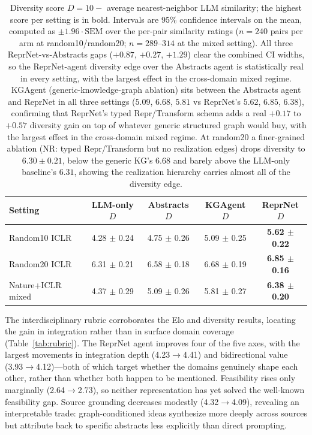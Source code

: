 \documentclass[10pt,twocolumn]{article}
\begin{document}
\begin{table}[t]
\centering
\small
\setlength{\tabcolsep}{4pt}
\begin{tabular}{lcccc}
\toprule
Setting           & LLM-only $D$     & Abstracts $D$    & KGAgent $D$      & ReprNet $D$ \\
\midrule
Random10 ICLR     & 4.28 $\pm$ 0.24 & 4.75 $\pm$ 0.26 & 5.09 $\pm$ 0.25 & \textbf{5.62 $\pm$ 0.22} \\
Random20 ICLR     & 6.31 $\pm$ 0.21 & 6.58 $\pm$ 0.18 & 6.68 $\pm$ 0.19 & \textbf{6.85 $\pm$ 0.16} \\
Nature+ICLR mixed & 4.37 $\pm$ 0.29 & 5.09 $\pm$ 0.26 & 5.81 $\pm$ 0.27 & \textbf{6.38 $\pm$ 0.20} \\
\bottomrule
\end{tabular}
\caption{Diversity score $D = 10 -$ average nearest-neighbor LLM
similarity; the highest score per setting is in bold.  Intervals are
95\% confidence intervals on the mean, computed as $\pm 1.96 \cdot
\mathrm{SEM}$ over the per-pair similarity ratings ($n = 240$ pairs
per arm at random10/random20; $n = 289$--$314$ at the mixed
setting).  All three ReprNet-vs-Abstracts gaps ($+0.87$, $+0.27$,
$+1.29$) clear the combined CI widths, so the ReprNet-agent diversity
edge over the Abstracts agent is statistically real in every
setting, with the largest effect in the cross-domain mixed regime.
KGAgent (generic-knowledge-graph ablation) sits between the Abstracts
agent and ReprNet in all three settings ($5.09$, $6.68$, $5.81$ vs
ReprNet's $5.62$, $6.85$, $6.38$), confirming that ReprNet's typed
Repr/Transform schema adds a real $+0.17$ to $+0.57$ diversity gain
on top of whatever generic structured graph would buy, with the
largest effect in the cross-domain mixed regime.  At random20 a
finer-grained ablation (NR: typed Repr/Transform but no realization
edges) drops diversity to $6.30 \pm 0.21$, below the generic KG's
$6.68$ and barely above the LLM-only baseline's $6.31$, showing the
realization hierarchy carries almost all of the diversity edge.}
\label{tab:diversity}
\end{table}

The interdisciplinary rubric corroborates the Elo and diversity results,
locating the gain in integration rather than in surface domain coverage
(Table~\ref{tab:rubric}).  The ReprNet agent improves four of the five
axes, with the largest movements in integration depth (4.23$\to$4.41) and
bidirectional value (3.93$\to$4.12)---both of which target whether the
domains genuinely shape each other, rather than whether both happen to be
mentioned.  Feasibility rises only marginally (2.64$\to$2.73), so neither
representation has yet solved the well-known feasibility gap.  Source
grounding decreases modestly (4.32$\to$4.09), revealing an interpretable
trade: graph-conditioned ideas synthesize more deeply across sources but
attribute back to specific abstracts less explicitly than direct
prompting.
\end{document}
